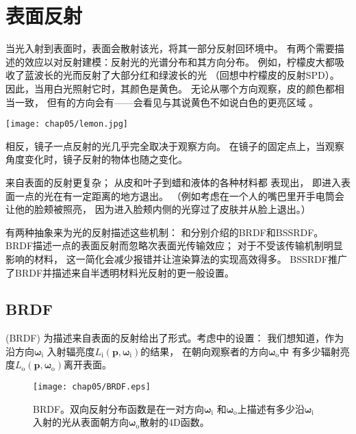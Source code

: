 \section{表面反射}\label{sec:表面反射}

当光入射到表面时，表面会散射该光，将其一部分反射回环境中。
有两个需要描述的效应以对反射建模：反射光的光谱分布和其方向分布。
例如，柠檬皮大都吸收了蓝波长的光而反射了大部分红和绿波长的光
（回想中柠檬皮的反射SPD）。
因此，当用白光照射它时，其颜色是黄色。
无论从哪个方向观察，皮的颜色都相当一致，
但有的方向会有——会看见与其说黄色不如说白色的更亮区域
。
\begin{marginfigure}
    \texttt{[image: chap05/lemon.jpg]}
\end{marginfigure}
相反，镜子一点反射的光几乎完全取决于观察方向。
在镜子的固定点上，当观察角度变化时，镜子反射的物体也随之变化。

来自表面的反射更复杂；
从皮和叶子到蜡和液体的各种材料都
表现出，
即进入表面一点的光在有一定距离的地方退出。
（例如考虑在一个人的嘴巴里开手电筒会让他的脸颊被照亮，
因为进入脸颊内侧的光穿过了皮肤并从脸上退出。）

有两种抽象来为光的反射描述这些机制：
和分别介绍的BRDF和BSSRDF。
BRDF描述一点的表面反射而忽略次表面光传输效应；
对于不受该传输机制明显影响的材料，
这一简化会减少报错并让渲染算法的实现高效得多。
BSSRDF推广了BRDF并描述来自半透明材料光反射的更一般设置。

\subsection{BRDF}\label{sub:BRDF}
(BRDF)
为描述来自表面的反射给出了形式。考虑中的设置：
我们想知道，作为沿方向${\bm\omega}_{\mathrm{i}}$
入射辐亮度$L_{\mathrm{i}}({\bm p},{\bm\omega}_{\mathrm{i}})$的结果，
在朝向观察者的方向${\bm\omega}_{\mathrm{o}}$中
有多少辐射亮度$L_{\mathrm{o}}({\bm p},{\bm\omega}_{\mathrm{o}})$离开表面。
\begin{figure}[htbp]
    \centering\texttt{[image: chap05/BRDF.eps]}
    \caption{BRDF。双向反射分布函数是在一对方向${\bm\omega}_{\mathrm{i}}$
        和${\bm\omega}_{\mathrm{o}}$上描述有多少沿${\bm\omega}_{\mathrm{i}}$
        入射的光从表面朝方向${\bm\omega}_{\mathrm{o}}$散射的4D函数。}
    \label{fig:5.18}
\end{figure}

